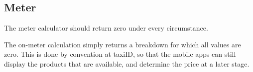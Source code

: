 




\subsection{Meter}
The meter calculator should return zero under every circumstance.


The on-meter calculation simply returns a breakdown for which all values are zero. This is done by convention at taxiID, so that the mobile apps can still display the products that are available, and determine the price at a later stage.

